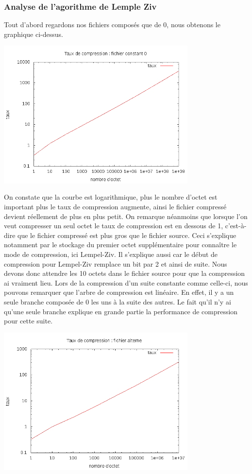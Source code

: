 \documentclass{report}
\begin{document}
\subsubsection{ Analyse de l'agorithme de Lemple Ziv}

Tout d'abord regardons nos fichiers composés que de 0, nous obtenons le graphique ci-dessus.
\begin{center}

\includegraphics[width=10cm]{LZConstant.png}

\end{center}

On constate que la courbe est logarithmique, plus le nombre d'octet est important plus le taux de compression augmente, ainsi le fichier compressé devient réellement de plus en plus petit. 
On remarque néanmoins que lorsque l'on veut compresser un seul octet le taux de compression est en dessous de 1, c'est-à-dire que le fichier compressé est plus gros que le fichier source. Ceci s'explique notamment par le stockage du premier  octet supplémentaire pour connaître le mode de compression, ici Lempel-Ziv. Il s'explique aussi car le début de compression pour Lempel-Ziv remplace un bit par 2 et ainsi de suite. Nous devons donc attendre les 10 octets dans le fichier source pour que la compression ai vraiment lieu. 
Lors de la compression d'un suite constante comme celle-ci, nous pouvons remarquer que l'arbre de compression est linéaire. En effet, il y a un seule branche composée de 0 les uns à la suite des autres. Le fait qu'il n'y ai qu'une seule branche explique en grande partie la performance de compression pour cette suite. 

\begin{center}
\includegraphics[width=10cm]{LZAlterner.png}
\end{center}
\end{document}
